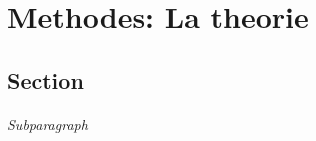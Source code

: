 \chapter{Methodes: La theorie}
\label{chap:methodes_theoriques}

\section{Section}


\subparagraph{Subparagraph}


